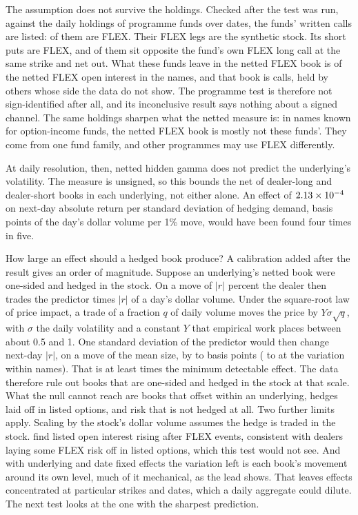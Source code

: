 \documentclass[11pt]{article}
\begin{document}
The assumption does not survive the holdings. Checked after the test was run, against the
daily holdings of \PBookFunds{} programme funds over \PBookCaptureDates{} dates, the funds'
written calls are listed: \PBookWrittenFlex{} of them are FLEX. Their FLEX legs are the
synthetic stock. Its short puts are \PBookPutFlex{} FLEX, and \PBookPutsPaired{} of them
sit opposite the fund's own FLEX long call at the same strike and net out. What these funds leave in the netted FLEX
book is \PBookFundShare{} of the netted FLEX open interest in the \PBookNames{} names, and
that book is \PBookCallShare{} calls, held by others whose side the data do not show. The
programme test is therefore not sign-identified after all, and its inconclusive result
says nothing about a signed channel. The same holdings sharpen what the netted measure
is: in names known for option-income funds, the netted FLEX book is mostly not these
funds'. They come from one fund family, and other programmes may use FLEX differently.

At daily resolution, then, netted hidden gamma does not predict the underlying's
volatility. The measure is unsigned, so this bounds the net of dealer-long and
dealer-short books in each underlying, not either alone. An effect of
$2.13\times10^{-4}$ on next-day absolute return per standard deviation of hedging
demand, \GPredSdX{} basis points of the day's dollar volume per 1\% move, would have been
found four times in five.

How large an effect should a hedged book produce? A calibration added after the result
gives an order of magnitude. Suppose an underlying's netted book were one-sided and
hedged in the stock. On a move of $|r|$ percent the dealer then trades the predictor times
$|r|$ of a day's dollar volume. Under the square-root law of price impact, a trade of a
fraction $q$ of daily volume moves the price by $Y\sigma\sqrt{q}$, with $\sigma$ the daily
volatility and a constant $Y$ that empirical work places between about 0.5 and 1. One
standard deviation of the predictor would then change next-day $|r|$, on a move of the
mean size, by \GCalPooledLow{} to \GCalPooledHigh{} basis points (\GCalWithinLow{} to
\GCalWithinHigh{} at the variation within names). That is at least \GCalRatio{} times the
minimum detectable effect. The data therefore rule out books that are one-sided and
hedged in the stock at that scale. What the null cannot reach are books that offset
within an underlying, hedges laid off in listed options, and risk that is not hedged at
all. Two further limits apply. Scaling by the stock's dollar volume
assumes the hedge is traded in the stock. \citet{prakash2026} find listed open interest
rising after FLEX events, consistent with dealers laying some FLEX risk off in listed
options, which this test would not see. And with underlying and date fixed effects the
variation left is each book's movement around its own level, much of it mechanical, as
the lead shows. That leaves effects concentrated at particular strikes and
dates, which a daily aggregate could dilute. The next test looks at the one with the
sharpest prediction.
\end{document}
